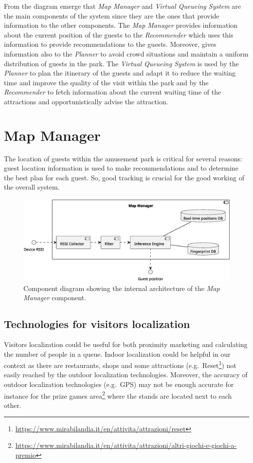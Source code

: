 From the diagram emerge that \textit{Map Manager} and \textit{Virtual Queueing System} are the main components of the system since they are the ones
that provide information to the other components. The \textit{Map Manager} provides information about the current position of the guests
to the \textit{Recommender} which uses this information to provide recommendations to the guests. Moreover, gives information also to the
\textit{Planner} to avoid crowd situations and maintain a uniform distribution of guests in the park. The \textit{Virtual Queueing System} is used by
the \textit{Planner} to plan the itinerary of the guests and adapt it to reduce the waiting time and improve the quality of the visit within the park
and by the \textit{Recommender} to fetch information about the current waiting time of the attractions and opportunistically advise the attraction.

\section{Map Manager}

The location of guests within the amusement park is critical for several reasons: guest location information is used to make recommendations and to determine the best plan for each guest. So, good tracking is crucial for the good working of the overall system.

\begin{figure}[H]
	\centering
	\includegraphics[width=\textwidth]{img/map-manager.eps}
	\caption{Component diagram showing the internal architecture of the \textit{Map Manager} component.
	}
	\label{fig:map-manager}
\end{figure}

\subsection{Technologies for visitors localization}\label{sec:technologies}
Visitors localization could be useful for both proximity marketing and calculating the number of people in a queue.
Indoor localization could be helpful in our context as there are restaurants, shops and some attractions
(e.g.\ Reset\footnote{\url{https://www.mirabilandia.it/en/attivita/attrazioni/reset}}) not easily reached by the outdoor localization technologies.
Moreover, the accuracy of outdoor localization technologies (e.g.\ GPS) may not be enough accurate for instance for the prize games area\footnote{\url{https://www.mirabilandia.it/en/attivita/attrazioni/altri-giochi-e-giochi-a-premio}}
where the stands are located next to each other.

